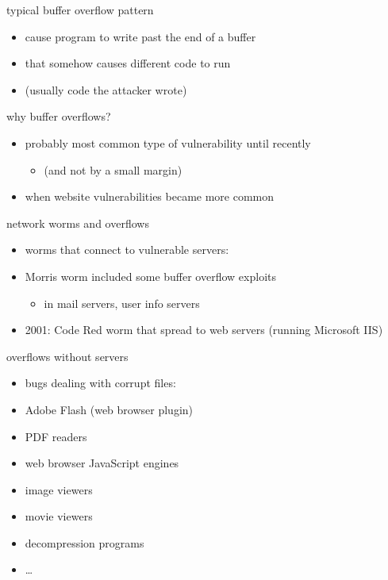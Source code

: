\begin{frame}{typical buffer overflow pattern}
    \begin{itemize}
    \item cause program to write past the end of a buffer
    \item that somehow causes different code to run
    \item (usually code the attacker wrote)
    \end{itemize}
\end{frame}

\begin{frame}{why buffer overflows?}
    \begin{itemize}
    \item probably most common type of vulnerability until recently
        \begin{itemize}
        \item (and not by a small margin)
        \end{itemize}
    \item when website vulnerabilities became more common
    \end{itemize}
\end{frame}


\begin{frame}{network worms and overflows}
    \begin{itemize}
    \item worms that connect to vulnerable servers:
    \vspace{.5cm}
    \item Morris worm included some buffer overflow exploits
        \begin{itemize}
        \item in mail servers, user info servers
        \end{itemize}
    \item 2001: Code Red worm that spread to web servers (running Microsoft IIS)
    \end{itemize}
\end{frame}

\begin{frame}{overflows without servers}
    \begin{itemize}
    \item bugs dealing with corrupt files:
    \vspace{.5cm}
    \item Adobe Flash (web browser plugin)
    \item PDF readers
    \item web browser JavaScript engines
    \item image viewers
    \item movie viewers 
    \item decompression programs
    \item \ldots
    \end{itemize}
\end{frame}

